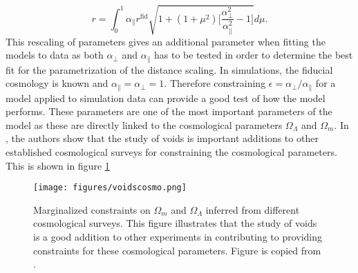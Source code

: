 \begin{equation}\label{eq:r_scaling}
    r=\int_0^1\alpha_\parallel r^{\mathrm{fid}}\sqrt{1+(1+\mu^2)\Big[\frac{\alpha_\perp^2}{\alpha_\parallel^2}-1\Big]}d\mu.
\end{equation}
This rescaling of parameters gives an additional parameter when fitting the models to data as both $\alpha_\perp$ and $\alpha_\parallel$ has to be tested in order to determine the best fit for the parametrization of the distance scaling. In simulations, the fiducial cosmology is known and $\alpha_\parallel=\alpha_\perp=1$. Therefore constraining $\epsilon=\alpha_\perp/\alpha_\parallel$ for a model applied to simulation data can provide a good test of how the model performs. These parameters are one of the most important parameters of the model as these are directly linked to the cosmological parameters $\Omega_\Lambda$ and $\Omega_m$. In \cite{Nadathur_2020}, the authors show that the study of voids is important additions to other established cosmological surveys for constraining the cosmological parameters. This is shown in figure \ref{fig:voidscosmoparam}
\begin{figure}
    \texttt{[image: figures/voidscosmo.png]}
    \caption{Marginalized constraints on $\Omega_m$ and $\Omega_\Lambda$ inferred from different cosmological surveys. This figure illustrates that the study of voids is a good addition to other experiments in contributing to providing constraints for these cosmological parameters. Figure is copied from \cite{Nadathur_2020}.}
    \label{fig:voidscosmoparam}
\end{figure}
